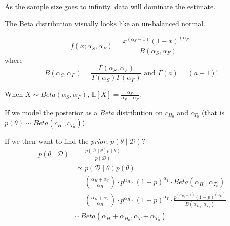 As the sample size goes to infinity, data will dominate the estimate.

\begin{aside}
The Beta distribution visually looks like an un-balanced normal. 

\begin{center}
\end{center}

\[f(x;\alpha_S, \alpha_F) = \frac{x^{(\alpha_S-1)}(1-x)^{(\alpha_F)}}{B(\alpha_S,\alpha_F)}\]
where 
\[B(\alpha_S,\alpha_F) = \frac{\Gamma(\alpha_S,\alpha_F)}{\Gamma(\alpha_S)\Gamma(\alpha_F)}\text{ and } \Gamma(a) = (a-1)!.\]

When $X\sim Beta(\alpha_S, \alpha_F)$, $\mathbb{E}[X] = \frac{\alpha_S}{\alpha_S + \alpha_F}$.

\end{aside}

If we model the posterior as a \emph{Beta} distribution on $c_{H_0}$ and $c_{T_0}$
(that is $p(\theta)\sim Beta(c_{H_0},c_{T_0})$).

If we then want to find the \textit{prior}, $p(\theta\mid\mathcal{D})$? 
\begin{align*}
p(\theta\mid\mathcal{D}) & = \frac{p(\mathcal{D}\mid\theta)p(\theta)}{p(\mathcal{D})}\\
				& \propto p(\mathcal{D}\mid\theta)p(\theta)\\
				& = {{\alpha_H + \alpha_T} \choose \alpha_H} \cdot p^{\alpha_H} \cdot (1-p)^{\alpha_T} \cdot Beta(\alpha_{H_0},\alpha_{T_0})\\
				& = {{\alpha_H + \alpha_T} \choose \alpha_H} \cdot p^{\alpha_H} \cdot (1-p)^{\alpha_T} \cdot \frac{p^{(\alpha_{H_0}-1)}(1-p)^{(\alpha_{T_0})}}{B(\alpha_{H_0},\alpha_{T_0})}\\
				& \sim Beta(\alpha_{H}+\alpha_{H_0},\alpha_{T}+\alpha_{T_0})
\end{align*}

